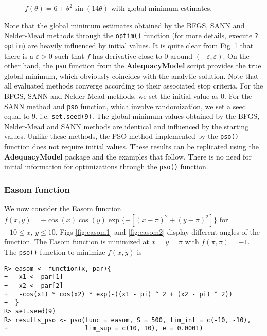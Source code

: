 \documentclass[10pt,letterpaper]{article}
\begin{document}
\begin{figure}[H]
\centering
\caption{$f(\theta) = 6 + \theta^2 \sin(14\theta)$ with global minimum estimates.}
\label{fig:f}
\end{figure}

Note that the global minimum estimates obtained by the BFGS, SANN and Nelder-Mead methods through the \texttt{optim()} function (for more details, execute \texttt{?optim}) are heavily influenced by initial values.
It is quite clear from Fig~\ref{fig:f} that there is a $\varepsilon >0$
such that $f$ has derivative close to 0 around $(-\varepsilon, \varepsilon)$.
On the other hand, the \texttt{pso} function from the
\textbf{AdequacyModel} script provides the true global minimum, which obviously coincides with the analytic solution.
Note that all evaluated methods converge according to their associated stop criteria.
For the BFGS, SANN and Nelder-Mead methods, we set the initial value as 0.
For the SANN method and \texttt{pso} function, which involve randomization, we set a seed equal to 9, i.e. \texttt{set.seed(9)}.
The global minimum values obtained by the BFGS, Nelder-Mead and SANN methods are identical and influenced by the starting values.
Unlike these methods, the PSO method implemented by the \texttt{pso()} function does not require initial values.
These results can be replicated using the \textbf{AdequacyModel} package and the examples that follow.
There is no need for initial information for optimizations through the \texttt{pso()} function.



\subsubsection{Easom function}

We now consider the Easom function $f(x,y) = -\cos(x)\cos(y)\exp\{-[(x-\pi)^2 + (y-\pi)^2]\}$ for $-10\leq x,\,y \leq 10$.
Figs \ref{fig:easom1} and \ref{fig:easom2} display different angles of the function.
The Easom function is
minimized at $x=y=\pi$ with $f(\pi,\pi)=-1$.
The \texttt{pso()} function to minimize $f(x,y)$ is

\begin{verbatim}
R> easom <- function(x, par){
+   x1 <- par[1]
+   x2 <- par[2]
+   -cos(x1) * cos(x2) * exp(-((x1 - pi) ^ 2 + (x2 - pi) ^ 2))
+  }
R> set.seed(9)
R> results_pso <- pso(func = easom, S = 500, lim_inf = c(-10, -10),
+                     lim_sup = c(10, 10), e = 0.0001)
\end{verbatim}
\end{document}
